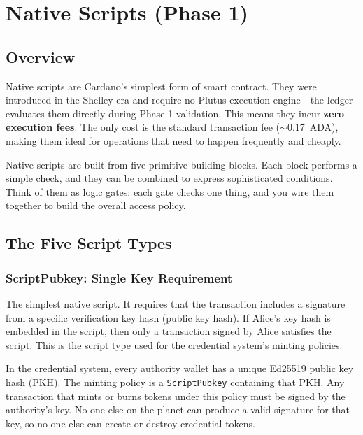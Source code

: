 \section{Native Scripts (Phase 1)}
\label{sec:native-scripts}

\subsection{Overview}

Native scripts are Cardano's simplest form of smart contract. They
were introduced in the Shelley era and require no Plutus execution
engine---the ledger evaluates them directly during Phase 1 validation.
This means they incur \textbf{zero execution fees}. The only cost is
the standard transaction fee (${\sim}$0.17~ADA), making them ideal for
operations that need to happen frequently and cheaply.

Native scripts are built from five primitive building blocks. Each
block performs a simple check, and they can be combined to express
sophisticated conditions. Think of them as logic gates: each gate
checks one thing, and you wire them together to build the overall
access policy.

\subsection{The Five Script Types}

\subsubsection{ScriptPubkey: Single Key Requirement}

The simplest native script. It requires that the transaction includes a
signature from a specific verification key hash (public key hash). If
Alice's key hash is embedded in the script, then only a transaction
signed by Alice satisfies the script. This is the script type used for
the credential system's minting policies.

In the credential system, every authority wallet has a unique Ed25519
public key hash (PKH). The minting policy is a \texttt{ScriptPubkey}
containing that PKH. Any transaction that mints or burns tokens under
this policy must be signed by the authority's key. No one else on the
planet can produce a valid signature for that key, so no one else can
create or destroy credential tokens.

